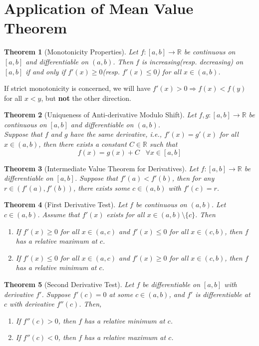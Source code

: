 \documentclass[12pt]{article}
\newtheorem{theorem}{Theorem}[section]
\theoremstyle{definition}
\begin{document}
\section{Application of Mean Value Theorem}
\begin{theorem}[Monotonicity Properties]
\normalfont Let $f:[a,b]\to\mathbb{R}$ be continuous on $[a,b]$ and differentiable on $(a,b)$. Then $f$ is increasing(resp. decreasing) on $[a,b]$ if and only if $f'(x)\geq 0$(resp. $f'(x)\leq 0$) for all $x\in(a,b)$.
\end{theorem}
If strict monotonicity is concerned, we will have $f'(x)>0\Rightarrow f(x)<f(y)$ for all $x<y$, but \textbf{not} the other direction.
\begin{theorem}[Uniqueness of Anti-derivative Modulo Shift]
\normalfont Let $f,g:[a,b]\to\mathbb{R}$ be continuous on $[a,b]$ and differentiable on $(a,b)$.\\Suppose that $f$ and $g$ have the same derivative, i.e., $f'(x)=g'(x)$ for all $x\in(a,b)$, then there exists a constant $C\in\mathbb{R}$ such that
\[
f(x) = g(x)+C\;\;\;\forall x\in[a,b]
\]
\end{theorem}
\begin{theorem}[Intermediate Value Theorem for Derivatives]
\normalfont Let $f:[a,b]\to\mathbb{R}$ be differentiable on $[a,b]$. Suppose that $f'(a)<f'(b)$, then for any $r\in(f'(a),f'(b))$, there exists some $c\in(a,b)$ with $f'(c)=r$.
\end{theorem}
\begin{theorem}[First Derivative Test]
\normalfont Let $f$ be continuous on $(a,b)$. Let $c\in(a,b)$. Assume that $f'(x)$ exists for all $x\in(a,b)\setminus\{c\}$. Then
\begin{enumerate}
	\item If $f'(x)\geq 0$ for all $x\in(a,c)$ and $f'(x)\leq 0$ for all $x\in(c,b)$, then $f$ has a relative maximum at $c$.
	\item If $f'(x)\leq 0$ for all $x\in(a,c)$ and $f'(x)\geq 0$ for all $x\in(c,b)$, then $f$ has a relative minimum at $c$.
\end{enumerate}
\end{theorem}
\begin{theorem}[Second Derivative Test]
\normalfont Let $f$ be differentiable on $[a,b]$ with derivative $f'$. Suppose $f'(c)=0$ at some $c\in(a,b)$, and $f'$ is differentiable at $c$ with derivative $f''(c)$. Then,
\begin{enumerate}
	\item If $f''(c)>0$, then $f$ has a relative minimum at $c$.
	\item If $f''(c)<0$, then $f$ has a relative maximum at $c$.
\end{enumerate}
\end{theorem}
\end{document}

